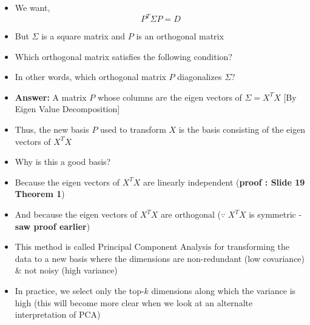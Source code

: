 \begin{frame}
  \begin{overlayarea}{\textwidth}{\textheight}
    \begin{itemize}\justifying
      \item<1-> We want,
            \begin{equation*}
              P^T \Sigma P = D
            \end{equation*}

      \item<2-> But $\Sigma$ is a square matrix and $P$ is an orthogonal matrix
      \item<3-> Which orthogonal matrix satisfies the following condition? \\
      \item<5-> In other words, which orthogonal matrix $P$ diagonalizes $\Sigma$?
      \item<6-> \textbf{Answer:} A matrix $P$ whose columns are the eigen vectors of $\Sigma = X^T X $ [By Eigen Value Decomposition]
      \item<7-> Thus, the new basis $P$ used to transform $X$ is the basis consisting of the eigen vectors of $X^T X$
    \end{itemize}
  \end{overlayarea}
\end{frame}

\begin{frame}
  \begin{overlayarea}{\textwidth}{\textheight}
    \begin{itemize}\justifying
      \item<1-> Why is this a good basis?
      \item<2-> Because the eigen vectors of $X^T X$ are linearly independent (\textbf{proof : Slide 19 Theorem 1})
      \item<3-> And because the eigen vectors of $X^T X$ are orthogonal ($\because$ $X^T X$ is symmetric - \textbf{saw proof earlier})
      \item<4-> This method is called Principal Component Analysis for transforming the data to a new basis where the dimensions are non-redundant (low covariance) \& not noisy (high variance)
      \item<5-> In practice, we select only the top-$k$ dimensions along which the variance is high (this will become more clear when we look at an alternalte interpretation of PCA)
    \end{itemize}
  \end{overlayarea}
\end{frame}
